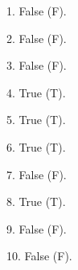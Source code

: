 \documentclass{article}
\begin{document}
1. False (F).

2. False (F).

3. False (F).

4. True (T).

5. True (T).

6. True (T).

7. False (F).

8. True (T).

9. False (F).

10. False (F).
\end{document}
